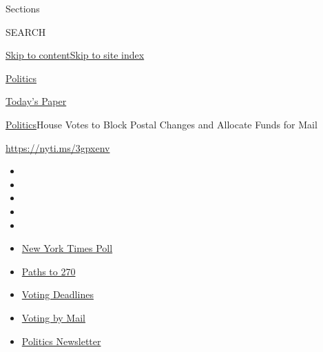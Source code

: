 Sections

SEARCH

\protect\hyperlink{site-content}{Skip to
content}\protect\hyperlink{site-index}{Skip to site index}

\href{https://www.nytimes3xbfgragh.onion/section/politics}{Politics}

\href{https://myaccount.nytimes3xbfgragh.onion/auth/login?response_type=cookie\&client_id=vi}{}

\href{https://www.nytimes3xbfgragh.onion/section/todayspaper}{Today's
Paper}

\href{/section/politics}{Politics}\textbar{}House Votes to Block Postal
Changes and Allocate Funds for Mail

\url{https://nyti.ms/3gpxenv}

\begin{itemize}
\item
\item
\item
\item
\item
\end{itemize}

\begin{itemize}
\item
  \href{https://www.nytimes3xbfgragh.onion/2020/09/12/us/politics/biden-trump-poll-wisconsin-minnesota.html?action=click\&pgtype=Article\&state=default\&region=TOP_BANNER\&context=storylines_menu}{New
  York Times Poll}
\item
  \href{https://www.nytimes3xbfgragh.onion/interactive/2020/us/elections/election-states-biden-trump.html?action=click\&pgtype=Article\&state=default\&region=TOP_BANNER\&context=storylines_menu}{Paths
  to 270}
\item
  \href{https://www.nytimes3xbfgragh.onion/interactive/2019/us/elections/2020-presidential-election-calendar.html?action=click\&pgtype=Article\&state=default\&region=TOP_BANNER\&context=storylines_menu}{Voting
  Deadlines}
\item
  \href{https://www.nytimes3xbfgragh.onion/interactive/2020/08/31/us/politics/vote-by-mail-deadlines.html?action=click\&pgtype=Article\&state=default\&region=TOP_BANNER\&context=storylines_menu}{Voting
  by Mail}
\item
  \href{https://www.nytimes3xbfgragh.onion/newsletters/politics?action=click\&pgtype=Article\&state=default\&region=TOP_BANNER\&context=storylines_menu}{Politics
  Newsletter}
\end{itemize}

